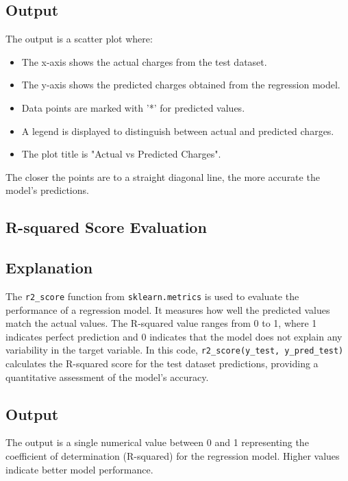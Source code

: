 \documentclass[11pt,a4paper]{report}
\begin{document}
\subsection*{Output}
The output is a scatter plot where:
\begin{itemize}
    \item The x-axis shows the actual charges from the test dataset.
    \item The y-axis shows the predicted charges obtained from the regression model.
    \item Data points are marked with '*' for predicted values.
    \item A legend is displayed to distinguish between actual and predicted charges.
    \item The plot title is "Actual vs Predicted Charges".
\end{itemize}

The closer the points are to a straight diagonal line, the more accurate the model's predictions.


    \begin{center}
    \end{center}
  \newpage
 
 
\subsection{R-squared Score Evaluation}

\subsection*{Explanation}
The \texttt{r2\_score} function from \texttt{sklearn.metrics} is used to evaluate the performance of a regression model. It measures how well the predicted values match the actual values. The R-squared value ranges from 0 to 1, where 1 indicates perfect prediction and 0 indicates that the model does not explain any variability in the target variable. In this code, \texttt{r2\_score(y\_test, y\_pred\_test)} calculates the R-squared score for the test dataset predictions, providing a quantitative assessment of the model's accuracy.

\subsection*{Output}
The output is a single numerical value between 0 and 1 representing the coefficient of determination (R-squared) for the regression model. Higher values indicate better model performance.
   
\end{document}
